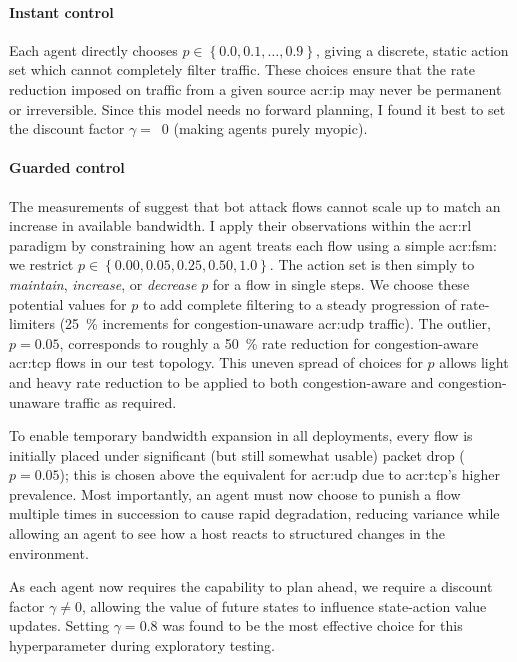 \paragraph{Instant control}
Each agent directly chooses $p \in \left\{ 0.0, 0.1, \ldots, 0.9 \right\}$, giving a discrete, static action set which cannot completely filter traffic.
These choices ensure that the rate reduction imposed on traffic from a given source \gls{acr:ip} may never be permanent or irreversible.
Since this model needs no forward planning, I found it best to set the discount factor $\gamma=$~0 (making agents purely myopic).

\paragraph{Guarded control}
The measurements of \textcite{DBLP:conf/ndss/KangGS16} suggest that bot attack flows cannot scale up to match an increase in available bandwidth.
I apply their observations within the \gls{acr:rl} paradigm by constraining how an agent treats each flow using a simple \gls{acr:fsm}: we restrict $p \in \left\{ 0.00, 0.05, 0.25, 0.50, 1.0 \right\}$.
The action set is then simply to \emph{maintain}, \emph{increase}, or \emph{decrease} $p$ for a flow in single steps.
We choose these potential values for $p$ to add complete filtering to a steady progression of rate-limiters (\qty{25}{\percent} increments for congestion-unaware \gls{acr:udp} traffic).
The outlier, $p=0.05$, corresponds to roughly a \qty{50}{\percent} rate reduction for congestion-aware \gls{acr:tcp} flows in our test topology.
This uneven spread of choices for $p$ allows light and heavy rate reduction to be applied to both congestion-aware and congestion-unaware traffic as required.

To enable temporary bandwidth expansion in all deployments, every flow is initially placed under significant (but still somewhat usable) packet drop ($p=0.05$); this is chosen above the equivalent for \gls{acr:udp} due to \gls{acr:tcp}'s higher prevalence.
Most importantly, an agent must now choose to punish a flow multiple times in succession to cause rapid degradation, reducing variance while allowing an agent to see how a host reacts to structured changes in the environment.

As each agent now requires the capability to plan ahead, we require a discount factor $\gamma \ne 0$, allowing the value of future states to influence state-action value updates.
Setting $\gamma = 0.8$ was found to be the most effective choice for this hyperparameter during exploratory testing.

